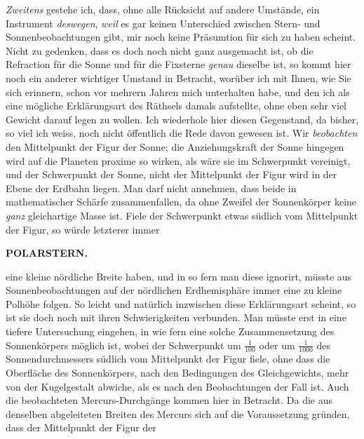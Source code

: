\par\indent \emph{Zweitens} gestehe ich, dass, ohne alle Rücksicht auf andere Umstände, ein Instrument \emph{deswegen}, \emph{weil} es gar keinen Unterschied zwischen Stern- und Sonnenbeobachtungen gibt, mir noch keine Präsumtion für sich zu haben scheint. Nicht zu gedenken, dass es doch noch nicht ganz ausgemacht ist, ob die Refraction für die Sonne und für die Fixsterne \emph{genau} dieselbe ist, so kommt hier noch ein anderer wichtiger Umstand in Betracht, worüber ich mit Ihnen, wie Sie sich erinnern, schon vor mehrern Jahren mich unterhalten habe, und den ich als eine mögliche Erklärungsart des Räthsels damals aufstellte, ohne eben sehr viel Gewicht darauf legen zu wollen. Ich wiederhole hier diesen Gegenstand, da bisher, so viel ich weiss, noch nicht öffentlich die Rede davon gewesen ist. Wir \emph{beobachten} den Mittelpunkt der Figur der Sonne; die Anziehungskraft der Sonne hingegen wird auf die Planeten proxime so wirken, als wäre sie im Schwerpunkt vereinigt, und der Schwerpunkt der Sonne, nicht der Mittelpunkt der Figur wird in der Ebene der Erdbahn liegen. Man darf nicht annehmen, dass beide in mathematischer Schärfe zusammenfallen, da ohne Zweifel der Sonnenkörper keine \emph{ganz} gleichartige Masse ist. Fiele der Schwerpunkt etwas südlich vom Mittelpunkt der Figur, so würde letzterer immer
\par
\clearpage
\thispagestyle{empty}
\noindent{}%
%
\parbox[t]{\dimexpr\linewidth-24mm\relax}{\centering\footnotesize\bfseries POLARSTERN.\par}%
\makebox[12mm][r]{}\par\nobreak\medskip
\noindent eine kleine nördliche Breite haben, und in so fern man diese ignorirt, müsste aus
Sonnenbeobachtungen auf der nördlichen Erdhemisphäre immer eine zu kleine Polhöhe
folgen. So leicht und natürlich inzwischen diese Erklärungsart scheint, so ist sie
doch noch mit ihren Schwierigkeiten verbunden. Man müsste erst in eine tiefere
Untersuchung eingehen, in wie fern eine solche Zusammensetzung des Sonnenkörpers
möglich ist, wobei der Schwerpunkt um $\frac{1}{100}$ oder um $\frac{1}{1000}$ des
Sonnendurchmessers südlich vom Mittelpunkt der Figur fiele, ohne dass die Oberfläche
des Sonnenkörpers, nach den Bedingungen des Gleichgewichts, mehr von der Kugelgestalt
abwiche, als es nach den Beobachtungen der Fall ist. Auch die beobachteten
Mercurs-Durchgänge kommen hier in Betracht. Da die aus denselben abgeleiteten Breiten
des Mercurs sich auf die Voraussetzung gründen, dass der Mittelpunkt der Figur der
